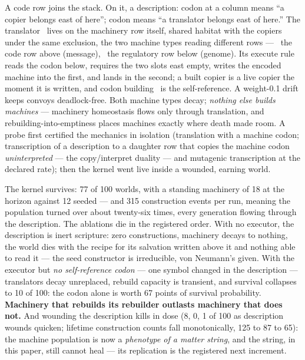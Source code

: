 A code row joins the stack. On it, a description: codon  at
a column means “a copier belongs east of here”; codon 
means “a translator belongs east of here.” The translator \Om\
lives on the machinery row itself, shared habitat with the
copiers under the same exclusion, the two machine types reading
different rows --- \Om\ the code row above (message), \Pc\ the
regulatory row below (genome). Its execute rule reads the codon
below, requires the two slots east empty, writes the encoded
machine into the first, and lands in the second; a built copier
is a live copier the moment it is written, and codon 
building \Om\ is the self-reference. A weight-0.1 drift keeps
convoys deadlock-free. Both machine types decay; {\it nothing
else builds machines} --- machinery homeostasis flows only
through translation, and rebuilding-into-emptiness places
machines exactly where death made room. A probe first certified
the mechanics in isolation (translation with a machine codon;
transcription of a description to a daughter row that copies the
machine codon {\it uninterpreted} --- the copy/interpret duality
--- and mutagenic transcription at the declared rate); then the
kernel went live inside a wounded, earning world.

\medskip\centerline{\picw=10.5cm }
\medskip

The kernel survives: 77 of 100 worlds, with a standing machinery
of 18 at the horizon against 12 seeded --- and 315 construction
events per run, meaning the population turned over about
twenty-six times, every generation flowing through the
description. The ablations die in the registered order. With no
executor, the description is inert scripture: zero constructions,
machinery decays to nothing, the world dies with the recipe for
its salvation written above it and nothing able to read it ---
the seed constructor is irreducible, von Neumann's given. With
the executor but {\it no self-reference codon} --- one symbol
changed in the description --- translators decay unreplaced,
rebuild capacity is transient, and survival collapses to 10 of
100: the  codon alone is worth 67 points of survival
probability. {\bf Machinery that rebuilds its rebuilder outlasts
machinery that does not.} And wounding the description kills in
dose (8, 0, 1 of 100 as description wounds quicken; lifetime
construction counts fall monotonically, 125 to 87 to 65): the
machine population is now a {\it phenotype of a matter string},
and the string, in this paper, still cannot heal --- its
replication is the registered next increment.

